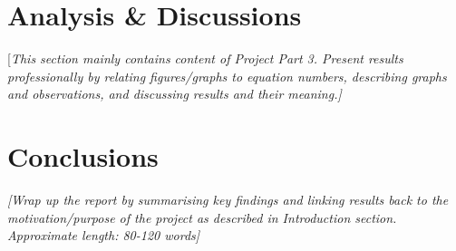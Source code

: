 \documentclass[11pt]{article}
\begin{document}
\section*{Analysis \& Discussions}\label{sec:anal_disc}
[\textcolor[rgb]{0.80,0.29,0.09}{\textsl{This section mainly contains content of Project Part 3. Present results professionally by relating figures/graphs to equation numbers, describing graphs and observations, and discussing results and their meaning.]}}

\section*{Conclusions}\label{sec:conclusion}
\textcolor[rgb]{0.80,0.29,0.09}{\textsl{[Wrap up the report by summarising key findings and linking results back to the motivation/purpose of the project as described in Introduction section. Approximate length: 80-120 words]}}


{}

\end{document}
